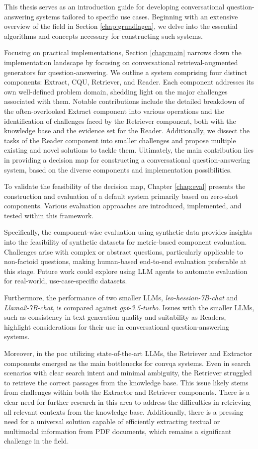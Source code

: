 This thesis serves as an introduction guide for developing conversational question-answering systems tailored to specific use cases. Beginning with an extensive overview of the field in Section \ref{chap:grundlagen}, we delve into the essential algorithms and concepts necessary for constructing such systems.

Focusing on practical implementations, Section \ref{chap:main} narrows down the implementation landscape by focusing on conversational retrieval-augmented generators for question-answering. We outline a system comprising four distinct components: Extract, CQU, Retriever, and Reader. Each component addresses its own well-defined problem domain, shedding light on the major challenges associated with them. Notable contributions include the detailed breakdown of the often-overlooked Extract component into various operations and the identification of challenges faced by the Retriever component, both with the knowledge base and the evidence set for the Reader. Additionally, we dissect the tasks of the Reader component into smaller challenges and propose multiple existing and novel solutions to tackle them. Ultimately, the main contribution lies in providing a decision map for constructing a conversational question-answering system, based on the diverse components and implementation possibilities.

To validate the feasibility of the decision map, Chapter \ref{chap:eval} presents the construction and evaluation of a default system primarily based on zero-shot components. Various evaluation approaches are introduced, implemented, and tested within this framework.

Specifically, the component-wise evaluation using synthetic data provides insights into the feasibility of synthetic datasets for metric-based component evaluation. Challenges arise with complex or abstract questions, particularly applicable to non-factoid questions, making human-based end-to-end evaluation preferable at this stage. Future work could explore using LLM agents to automate evaluation for real-world, use-case-specific datasets.

Furthermore, the performance of two smaller LLMs, \textit{leo-hessian-7B-chat} and \textit{Llama2-7B-chat}, is compared against \textit{gpt-3.5-turbo}. Issues with the smaller LLMs, such as consistency in text generation quality and suitability as Readers, highlight considerations for their use in conversational question-answering systems.

Moreover, in the \gls{poc} utilizing state-of-the-art LLMs, the Retriever and Extractor components emerged as the main bottlenecks for \gls{convqa} systems. Even in search scenarios with clear search intent and minimal ambiguity, the Retriever struggled to retrieve the correct passages from the knowledge base. This issue likely stems from challenges within both the Extractor and Retriever components. There is a clear need for further research in this area to address the difficulties in retrieving all relevant contexts from the knowledge base. Additionally, there is a pressing need for a universal solution capable of efficiently extracting textual or multimodal information from PDF documents, which remains a significant challenge in the field.

